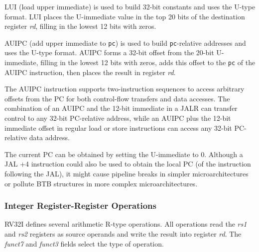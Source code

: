 LUI (load upper immediate) is used to build 32-bit constants and uses
the U-type format.  LUI places the U-immediate value in the top 20
bits of the destination register {\em rd}, filling in the lowest 12
bits with zeros.

AUIPC (add upper immediate to {\tt pc}) is used to build {\tt pc}-relative
addresses and uses the U-type format.  AUIPC forms a 32-bit offset from the
20-bit U-immediate, filling in the lowest 12 bits with zeros, adds this offset
to the {\tt pc} of the AUIPC instruction, then places the result in register {\em rd}.

\begin{commentary}
The AUIPC instruction supports two-instruction sequences to access
arbitrary offsets from the PC for both control-flow transfers and data
accesses.  The combination of an AUIPC and the 12-bit immediate in a
JALR can transfer control to any 32-bit PC-relative address, while an
AUIPC plus the 12-bit immediate offset in regular load or store
instructions can access any 32-bit PC-relative data address.

The current PC can be obtained by setting the U-immediate to 0.
Although a JAL +4 instruction could also be used to obtain the local
PC (of the instruction following the JAL), it might cause pipeline
breaks in simpler microarchitectures or pollute BTB structures in more
complex microarchitectures.
\end{commentary}

\begin{formalspec}
  \sailfclUTYPEexecute
\end{formalspec}

\subsubsection*{Integer Register-Register Operations}

RV32I defines several arithmetic R-type operations.  All operations
read the {\em rs1} and {\em rs2} registers as source operands and
write the result into register {\em rd}.  The {\em funct7} and {\em
  funct3} fields select the type of operation.

